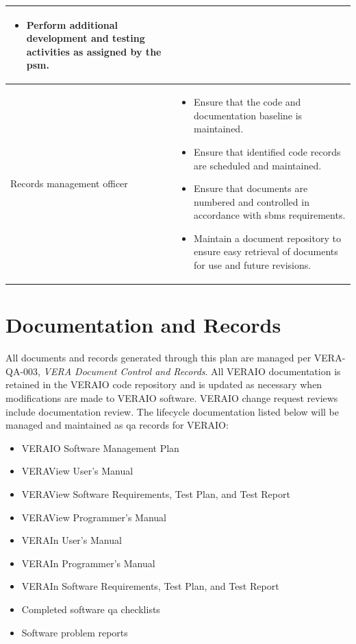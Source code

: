 \documentclass{vera-ornltm}
\begin{document}
\begin{longtable}{>{\raggedleft}p{}p{}}
\begin{itemize}
\item Perform additional development and testing activities as assigned by the \ac{psm}.
\end{itemize}\\
\midrule
Records management officer &%
\begin{itemize}
\item Ensure that the code and documentation baseline is maintained.
\item Ensure that identified code records are scheduled and maintained.
\item Ensure that documents are numbered and controlled in accordance with \ac{sbms} requirements.
\item Maintain a document repository to ensure easy retrieval of documents for use and future revisions.
\end{itemize}\\
\bottomrule
\end{longtable}


\section{Documentation and Records}

All documents and records generated through this plan are managed per VERA-QA-003, {\it VERA Document Control and Records}.
All VERAIO documentation is retained in the VERAIO code repository and is updated as necessary when modifications are made to VERAIO software.
VERAIO change request reviews include documentation review.
The lifecycle documentation listed below will be managed and maintained as \ac{qa} records for VERAIO:

\begin{itemize}
\item VERAIO Software Management Plan
\item VERAView User's Manual
\item VERAView Software Requirements, Test Plan, and Test Report
\item VERAView Programmer's Manual
\item VERAIn User's Manual
\item VERAIn  Programmer's Manual
\item VERAIn  Software Requirements, Test Plan, and Test Report
\item Completed software \ac{qa} checklists
\item Software problem reports
\end{itemize}
\end{document}

